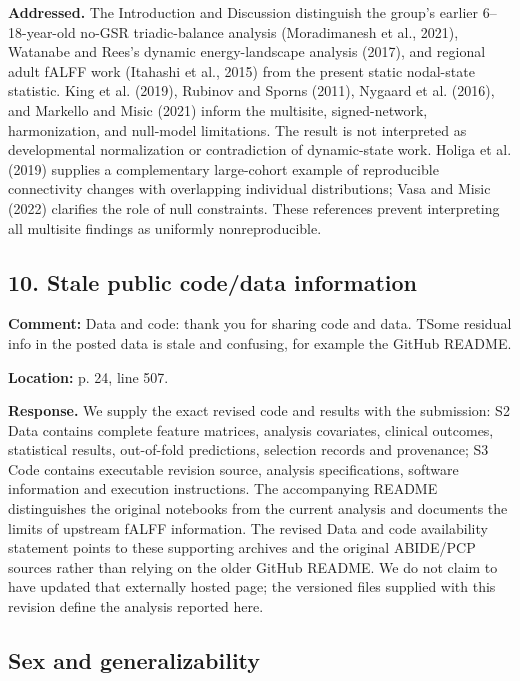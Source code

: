 \documentclass[11pt]{article}
\begin{document}
 \textbf{Addressed.} The Introduction and Discussion distinguish the group's earlier 6--18-year-old no-GSR triadic-balance analysis (Moradimanesh et al., 2021), Watanabe and Rees's dynamic energy-landscape analysis (2017), and regional adult fALFF work (Itahashi et al., 2015) from the present static nodal-state statistic. King et al. (2019), Rubinov and Sporns (2011), Nygaard et al. (2016), and Markello and Misic (2021) inform the multisite, signed-network, harmonization, and null-model limitations. The result is not interpreted as developmental normalization or contradiction of dynamic-state work. Holiga et al. (2019) supplies a complementary large-cohort example of reproducible connectivity changes with overlapping individual distributions; Vasa and Misic (2022) clarifies the role of null constraints. These references prevent interpreting all multisite findings as uniformly nonreproducible.


\subsection*{10. Stale public code/data information}

\textbf{Comment:} Data and code: thank you for sharing code and data. TSome residual info in the posted data is stale and confusing, for example the GitHub README.


\textbf{Location:} p. 24, line 507.


 \textbf{Response.} We supply the exact revised code and results with the submission: S2 Data contains complete feature matrices, analysis covariates, clinical outcomes, statistical results, out-of-fold predictions, selection records and provenance; S3 Code contains executable revision source, analysis specifications, software information and execution instructions. The accompanying README distinguishes the original notebooks from the current analysis and documents the limits of upstream fALFF information. The revised Data and code availability statement points to these supporting archives and the original ABIDE/PCP sources rather than relying on the older GitHub README. We do not claim to have updated that externally hosted page; the versioned files supplied with this revision define the analysis reported here.


\subsection*{Sex and generalizability}
\end{document}
